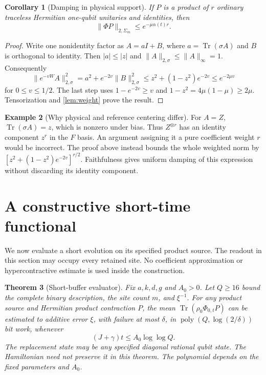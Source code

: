 \documentclass[11pt,reqno]{amsart}
\numberwithin{equation}{section}
\newtheorem{theorem}{Theorem}[section]
\newtheorem{corollary}[theorem]{Corollary}
\theoremstyle{definition}
\newtheorem{example}[theorem]{Example}
\theoremstyle{remark}
\newcommand{\Tr}{\operatorname{Tr}}
\newcommand{\poly}{\operatorname{poly}}
\newcommand{\nn}[1]{\lVert#1\rVert}
\begin{document}
\begin{corollary}[Damping in physical support]\label{cor:physical}
If $P$ is a product of $r$ ordinary traceless Hermitian one-qubit unitaries and identities, then
\begin{equation}\label{eq:physical}
 \nn{\Phi P}_{2,\Sigma_m}\leq e^{-\mu\alpha(t)r}.
\end{equation}
\end{corollary}
\begin{proof}
Write one nonidentity factor as $A=aI+B$, where $a=\Tr(\sigma A)$ and $B$ is orthogonal to identity. Then $|a|\leq|z|$ and $\nn A_{2,\sigma}\leq\nn A_\infty=1$. Consequently
\[
 \nn{e^{-vW}A}_{2,\sigma}^2
 =a^2+e^{-2v}\nn B_{2,\sigma}^2
 \leq z^2+(1-z^2)e^{-2v}\leq e^{-2\mu v}
\]
for $0\leq v\leq1/2$. The last step uses $1-e^{-2v}\geq v$ and $1-z^2=4\mu(1-\mu)\geq2\mu$. Tensorization and \cref{lem:weight} prove the result.
\end{proof}

\begin{example}[Why physical and reference centering differ]
For $A=Z$, $\Tr(\sigma A)=z$, which is nonzero under bias. Thus $Z^{\otimes r}$ has an identity component $z^r$ in the $F$ basis. An argument assigning it a pure coefficient weight $r$ would be incorrect. The proof above instead bounds the whole weighted norm by $[z^2+(1-z^2)e^{-2v}]^{r/2}$. Faithfulness gives uniform damping of this expression without discarding its identity component.
\end{example}


\section{A constructive short-time functional}\label{sec:buffer}

We now evaluate a short evolution on its specified product source. The readout in this section may occupy every retained site. No coefficient approximation or hypercontractive estimate is used inside the construction.

\begin{theorem}[Short-buffer evaluator]\label{thm:buffer}
Fix $a,k,d,g$ and $A_0>0$. Let $Q\geq16$ bound the complete binary description, the site count $m$, and $\xi^{-1}$. For any product source and Hermitian product contraction $P$, the mean $\Tr(\rho_0\Phi_{0,t}P)$ can be estimated to additive error $\xi$, with failure at most $\delta$, in $\poly(Q,\log(2/\delta))$ bit work, whenever
\begin{equation}\label{eq:shorttime}
 (J+\gamma)t\leq A_0\log\log Q.
\end{equation}
The replacement state may be any specified diagonal rational qubit state. The Hamiltonian need not preserve it in this theorem. The polynomial depends on the fixed parameters and $A_0$.
\end{theorem}
\end{document}
